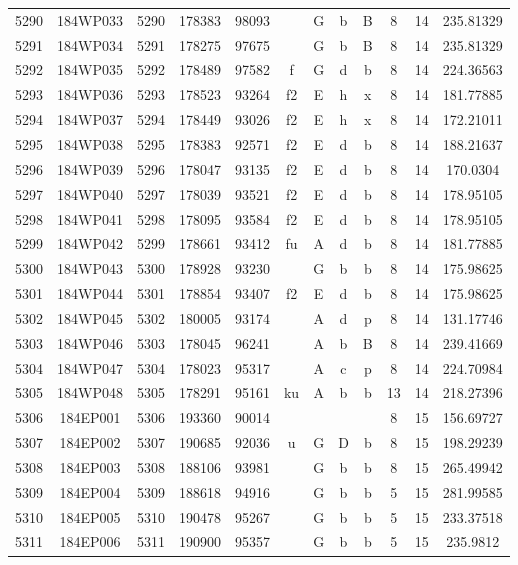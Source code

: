 \begin{tabular}{|*{12}{c|}}
5290 & 184WP033 & 5290 & 178383 & 98093 &  & G & b & B & 8 & 14 & 235.81329 \\ 
5291 & 184WP034 & 5291 & 178275 & 97675 &  & G & b & B & 8 & 14 & 235.81329 \\ 
5292 & 184WP035 & 5292 & 178489 & 97582 & f & G & d & b & 8 & 14 & 224.36563 \\ 
5293 & 184WP036 & 5293 & 178523 & 93264 & f2 & E & h & x & 8 & 14 & 181.77885 \\ 
5294 & 184WP037 & 5294 & 178449 & 93026 & f2 & E & h & x & 8 & 14 & 172.21011 \\ 
5295 & 184WP038 & 5295 & 178383 & 92571 & f2 & E & d & b & 8 & 14 & 188.21637 \\ 
5296 & 184WP039 & 5296 & 178047 & 93135 & f2 & E & d & b & 8 & 14 & 170.0304 \\ 
5297 & 184WP040 & 5297 & 178039 & 93521 & f2 & E & d & b & 8 & 14 & 178.95105 \\ 
5298 & 184WP041 & 5298 & 178095 & 93584 & f2 & E & d & b & 8 & 14 & 178.95105 \\ 
5299 & 184WP042 & 5299 & 178661 & 93412 & fu & A & d & b & 8 & 14 & 181.77885 \\ 
5300 & 184WP043 & 5300 & 178928 & 93230 &  & G & b & b & 8 & 14 & 175.98625 \\ 
5301 & 184WP044 & 5301 & 178854 & 93407 & f2 & E & d & b & 8 & 14 & 175.98625 \\ 
5302 & 184WP045 & 5302 & 180005 & 93174 &  & A & d & p & 8 & 14 & 131.17746 \\ 
5303 & 184WP046 & 5303 & 178045 & 96241 &  & A & b & B & 8 & 14 & 239.41669 \\ 
5304 & 184WP047 & 5304 & 178023 & 95317 &  & A & c & p & 8 & 14 & 224.70984 \\ 
5305 & 184WP048 & 5305 & 178291 & 95161 & ku & A & b & b & 13 & 14 & 218.27396 \\ 
5306 & 184EP001 & 5306 & 193360 & 90014 &  &  &  &  & 8 & 15 & 156.69727 \\ 
5307 & 184EP002 & 5307 & 190685 & 92036 & u & G & D & b & 8 & 15 & 198.29239 \\ 
5308 & 184EP003 & 5308 & 188106 & 93981 &  & G & b & b & 8 & 15 & 265.49942 \\ 
5309 & 184EP004 & 5309 & 188618 & 94916 &  & G & b & b & 5 & 15 & 281.99585 \\ 
5310 & 184EP005 & 5310 & 190478 & 95267 &  & G & b & b & 5 & 15 & 233.37518 \\ 
5311 & 184EP006 & 5311 & 190900 & 95357 &  & G & b & b & 5 & 15 & 235.9812 \\ 

\end{tabular}

